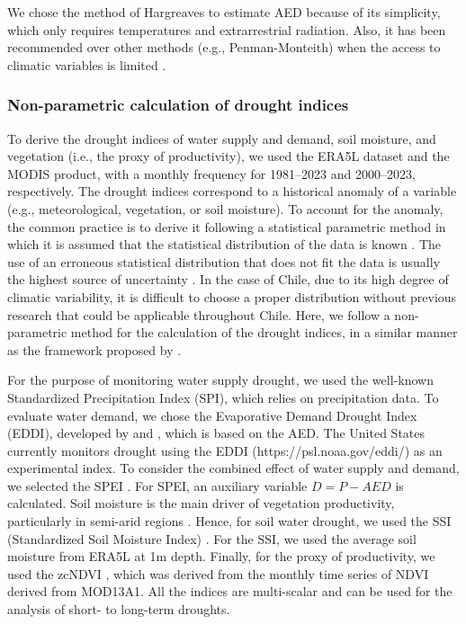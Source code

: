 \documentclass[
  authoryear,
  preprint,
  3p,
  onecolumn]{elsarticle}
\begin{document}
We chose the method of Hargreaves to estimate AED because of its
simplicity, which only requires temperatures and extrarrestrial
radiation. Also, it has been recommended over other methods (e.g.,
Penman-Monteith) when the access to climatic variables is limited
\citep{Vicente-Serrano2014}.

\hypertarget{non-parametric-calculation-of-drought-indices}{%
\subsubsection{Non-parametric calculation of drought
indices}\label{non-parametric-calculation-of-drought-indices}}

To derive the drought indices of water supply and demand, soil moisture,
and vegetation (i.e., the proxy of productivity), we used the ERA5L
dataset and the MODIS product, with a monthly frequency for 1981--2023
and 2000--2023, respectively. The drought indices correspond to a
historical anomaly of a variable (e.g., meteorological, vegetation, or
soil moisture). To account for the anomaly, the common practice is to
derive it following a statistical parametric method in which it is
assumed that the statistical distribution of the data is known
\citep{Heim2002}. The use of an erroneous statistical distribution that
does not fit the data is usually the highest source of uncertainty
\citep{Laimighofer2022}. In the case of Chile, due to its high degree of
climatic variability, it is difficult to choose a proper distribution
without previous research that could be applicable throughout Chile.
Here, we follow a non-parametric method for the calculation of the
drought indices, in a similar manner as the framework proposed by
\citet{Farahmand2015}.

For the purpose of monitoring water supply drought, we used the
well-known Standardized Precipitation Index (SPI), which relies on
precipitation data. To evaluate water demand, we chose the Evaporative
Demand Drought Index (EDDI), developed by \citet{Hobbins2016} and
\citet{McEvoy2016}, which is based on the AED. The United States
currently monitors drought using the EDDI (https://psl.noaa.gov/eddi/)
as an experimental index. To consider the combined effect of water
supply and demand, we selected the SPEI \citep{Vicente-Serrano2010}. For
SPEI, an auxiliary variable \(D=P-AED\) is calculated. Soil moisture is
the main driver of vegetation productivity, particularly in semi-arid
regions \citep{Li2022}. Hence, for soil water drought, we used the SSI
(Standardized Soil Moisture Index) \citep{Hao2013}. For the SSI, we used
the average soil moisture from ERA5L at 1m depth. Finally, for the proxy
of productivity, we used the zcNDVI \citep{Zambrano2018}, which was
derived from the monthly time series of NDVI derived from MOD13A1. All
the indices are multi-scalar and can be used for the analysis of short-
to long-term droughts.
\end{document}
